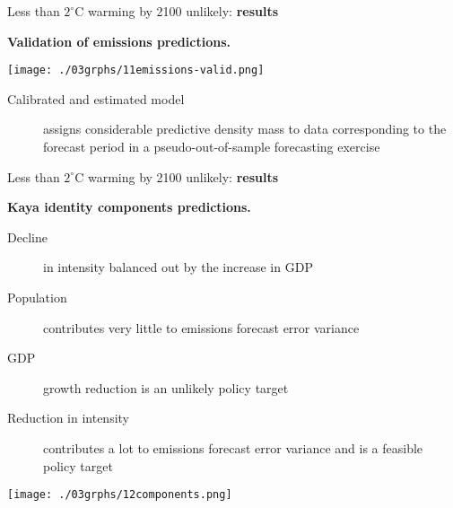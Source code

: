 \documentclass[notes,blackandwhite,mathsans,usenames,dvipsnames]{beamer}
\begin{document}
\begin{frame}{Less than $2^{\circ}$C warming by 2100 unlikely: \textbf{results}}

\textbf{Validation of emissions predictions.}
\begin{center}
\texttt{[image: ./03grphs/11emissions-valid.png]}
\end{center}
\begin{description}
\item[Calibrated and estimated model] assigns considerable predictive density mass to data corresponding to the forecast period in a pseudo-out-of-sample forecasting exercise

\end{description}

\end{frame}






\begin{frame}{Less than $2^{\circ}$C warming by 2100 unlikely: \textbf{results}}

\textbf{Kaya identity components predictions.}
\begin{center}
\begin{multicols}{2}
\begin{description}
\item[Decline] in intensity balanced out by the increase in GDP
\item[Population] contributes very little to emissions forecast error variance
\item[GDP] growth reduction is an unlikely policy target 
\item[Reduction in intensity] contributes a lot to emissions forecast error variance and is a feasible policy target
\end{description}

\texttt{[image: ./03grphs/12components.png]}
\end{multicols}
\end{center}
\end{frame}
\end{document}
